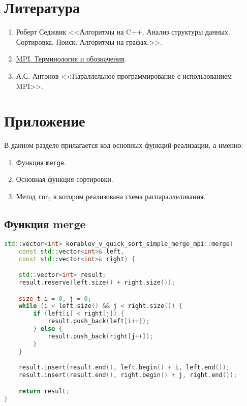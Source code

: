 \documentclass[12pt]{article}
\begin{document}
\section*{Литература}

\begin{enumerate}
    \item {Роберт Седжвик <<Алгоритмы на C++. Анализ структуры данных. Сортировка. Поиск. Алгоритмы на графах.>>}.
    \item \href{https://parallel.ru/vvv/mpi.html#p1}{MPI. Терминология и обозначения}.
    \item {А.С. Антонов <<Параллельное программирование с использованием MPI>>}.
\end{enumerate}

\appendix
\section*{Приложение}

В данном разделе прилагается код основных функций реализации, а именно:
\begin{enumerate}
    \item {Функция \texttt{merge}}.
    \item {Основная функция сортировки}.
    \item {Метод \texttt{run}, в котором реализована схема распараллеливания}.
\end{enumerate}

\subsection*{Функция merge}

\begin{lstlisting}[language=C++]
std::vector<int> korablev_v_quick_sort_simple_merge_mpi::merge(
    const std::vector<int>& left,
    const std::vector<int>& right) {

    std::vector<int> result;
    result.reserve(left.size() + right.size());

    size_t i = 0, j = 0;
    while (i < left.size() && j < right.size()) {
        if (left[i] < right[j]) {
            result.push_back(left[i++]);
        } else {
            result.push_back(right[j++]);
        }
    }

    result.insert(result.end(), left.begin() + i, left.end());
    result.insert(result.end(), right.begin() + j, right.end());

    return result;
}
\end{lstlisting}
\end{document}
